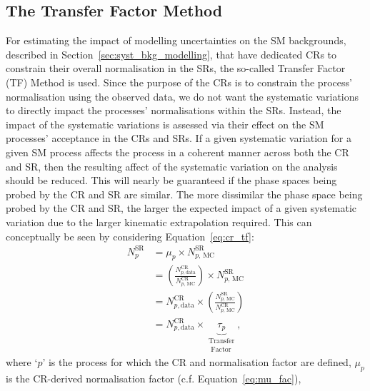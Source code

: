 %
%
\subsection{The Transfer Factor Method}
\label{sec:transfer_factor}

For estimating the impact of modelling uncertainties on the SM backgrounds, described in Section~\ref{sec:syst_bkg_modelling},  that
have dedicated CRs to constrain their overall normalisation in the SRs,
the so-called Transfer Factor (TF) Method is used.
Since the purpose of the CRs is to constrain the process' normalisation using
the observed data, we do not want the systematic variations to directly
impact the processes' normalisations within the SRs.
Instead, the impact of the systematic variations is assessed via their effect
on the SM processes' acceptance in the CRs and SRs.
If a given systematic variation for a given SM process affects the process
in a coherent manner across both the CR and SR, then the resulting affect of the systematic variation
on the analysis should be reduced.
This will nearly be guaranteed if the phase spaces being probed by the CR and SR
are similar.
The more dissimilar the phase space being probed by the CR and SR, the larger
the expected impact of a given systematic variation due to the larger kinematic
extrapolation required.
This can conceptually be seen by considering Equation~\ref{eq:cr_tf}:
\begin{align}
    N_{p}^{\text{SR}} &= \mu_p \times N_{p,\,\text{MC}}^{\text{SR}} \nonumber \\
        &= \left( \frac{N_{p, \text{data}}^{\text{CR}}}{N_{p,\,\text{MC}}^{\text{CR}}} \right) \times N_{p,\,\text{MC}}^{\text{SR}} \nonumber \\
        &= N_{p, \text{data}}^{\text{CR}} \times \left( \frac{ N_{p,\,\text{MC}}^{\text{SR}}  }{ N_{p,\,\text{MC}}^{\text{CR}} } \right) \label{eq:cr_tf} \\
        &= N_{p, \text{data}}^{\text{CR}} \times \underbrace{\tau_p}_{\substack{\text{Transfer} \\ \text{ Factor}}} \nonumber,
\end{align}
where `$p$' is the process for which the CR and normalisation factor are defined, $\mu_p$
is the CR-derived normalisation factor (c.f. Equation~\ref{eq:mu_fac}),
